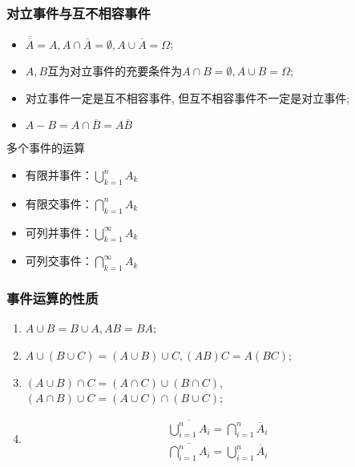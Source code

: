 \begin{frame}
  \frametitle{对立事件与互不相容事件}
  \begin{itemize}[<+-|alert@+>]
  \item $\overline{\overline{A}}=A, A\cap \overline{A}=\emptyset, A\cup \overline{A}=\Omega$;
  \item $A,B$互为对立事件的充要条件为$A\cap B=\emptyset, A\cup B=\Omega$;
  \item 对立事件一定是互不相容事件, 但互不相容事件不一定是对立事件;
  \item $A-B=A\cap \overline{B}=A\overline{B}$
  \end{itemize}
\end{frame}

\begin{frame}{多个事件的运算}
	\begin{itemize}[<+-|alert@+>]

		\item 有限并事件：$\bigcup_{k=1}^{n}A_{k}$%
		\item 有限交事件：$\bigcap_{k=1}^{n}A_{k}$%
		\item 可列并事件：$\bigcup_{k=1}^{\infty}A_{k}$%
		\item 可列交事件：$\bigcap_{k=1}^{\infty}A_{k}$%
	\end{itemize}
\end{frame}


\begin{frame}
	\frametitle{事件运算的性质}
	\begin{enumerate}[<+-|alert@+>][(1)]
		\item {} $A\cup B=B\cup A, AB=BA$;
		\item {} $A\cup (B\cup C)=(A\cup B)\cup C, (AB)C=A(BC)$;
		\item {} $(A\cup B)\cap C=(A\cap C)\cup (B\cap C)$, \\\qquad \qquad $(A\cap B)\cup C=(A\cup C)\cap (B\cup C)$;
		\item {}
		\begin{eqnarray*}
			\overline{\bigcup_{i=1}^nA_i}=\bigcap_{i=1}^n \overline{A}_i\\
			\overline{\bigcap_{i=1}^nA_i}=\bigcup_{i=1}^n \overline{A}_i
		\end{eqnarray*}
	\end{enumerate}
\end{frame}


